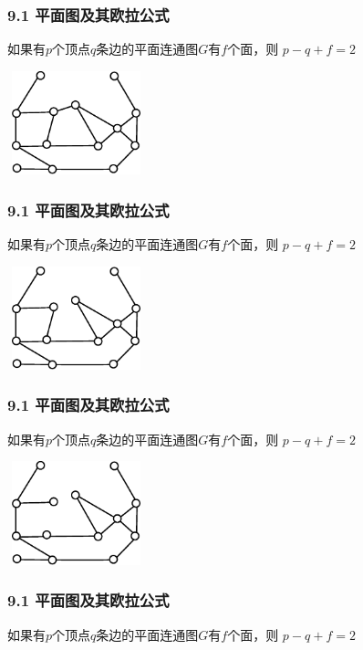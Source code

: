 \documentclass{beamer}
\begin{document}
\begin{CJK}{UTF8}{gbsn}
\begin{frame}
  \frametitle{9.1 平面图及其欧拉公式}
  \begin{theorem9.1.1}
    如果有$p$个顶点$q$条边的平面连通图$G$有$f$个面，则
      $p - q + f = 2$
  \end{theorem9.1.1}
\vspace{1cm}
\centering
    \includegraphics[width=4cm,height=3cm]{euler1}
\end{frame}
\begin{frame}
  \frametitle{9.1 平面图及其欧拉公式}
  \begin{theorem9.1.1}
    如果有$p$个顶点$q$条边的平面连通图$G$有$f$个面，则
      $p - q + f = 2$
  \end{theorem9.1.1}
\vspace{1cm}
\centering
    \includegraphics[width=4cm,height=3cm]{euler2}
\end{frame}
\begin{frame}
  \frametitle{9.1 平面图及其欧拉公式}
  \begin{theorem9.1.1}
    如果有$p$个顶点$q$条边的平面连通图$G$有$f$个面，则
      $p - q + f = 2$
  \end{theorem9.1.1}
\vspace{1cm}
\centering
    \includegraphics[width=4cm,height=3cm]{euler3}
\end{frame}
\begin{frame}
  \frametitle{9.1 平面图及其欧拉公式}
  \begin{theorem9.1.1}
    如果有$p$个顶点$q$条边的平面连通图$G$有$f$个面，则
      $p - q + f = 2$

\end{theorem9.1.1}
\end{frame}
\end{CJK}
\end{document}
